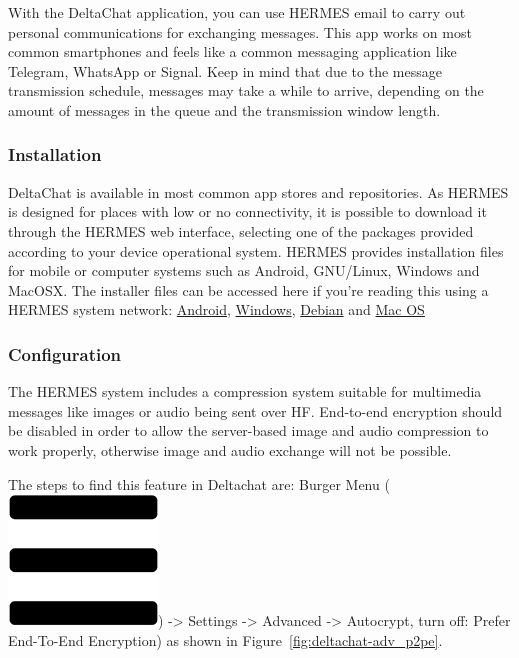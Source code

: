 \documentclass[11pt,a4paper]{article}
\begin{document}
With the DeltaChat application, you can use HERMES email to carry out personal communications for exchanging messages. This app works on most common smartphones and feels like a common messaging application like Telegram, WhatsApp or Signal. Keep in mind that due to the message transmission schedule, messages may take a while to arrive, depending on the amount of messages in the queue and the transmission window length.

\subsubsection{Installation}

DeltaChat is available in most common app stores and repositories. As HERMES is designed for places with low or no connectivity, it is possible to download it through the HERMES web interface, selecting one of the packages provided according to your device operational system. HERMES provides installation files for mobile or computer systems such as Android, GNU/Linux, Windows and MacOSX. The installer files can be accessed here if you're reading this using a HERMES system network: \href{ http://10.0.0.1/dowloads/deltachat.apk}{Android},  \href{ http://10.0.0.1/dowloads/deltachat.exe}{Windows},  \href{ http://10.0.0.1/dowloads/deltachat.deb}{Debian} and \href{http://10.0.0.1/dowloads/deltachat.dmg}{Mac OS}


\subsubsection{Configuration}

The HERMES system includes a compression system suitable for multimedia messages like images or audio being sent over HF.  End-to-end encryption should be disabled in order to allow the server-based image and audio compression to work properly, otherwise image and audio exchange will not be possible.

The steps to find this feature in Deltachat are: Burger Menu (\includegraphics[height=0.78\baselineskip]{pictures/burger.png}) -> Settings -> Advanced -> Autocrypt, turn off: Prefer End-To-End Encryption) as shown in Figure~\ref{fig:deltachat-adv_p2pe}.
\end{document}
